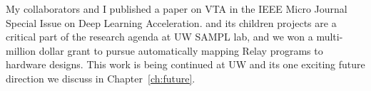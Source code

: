 My collaborators and I published a paper on VTA in
  the IEEE Micro Journal Special Issue on Deep Learning Acceleration.
\vta and its children projects are a critical part of the research
  agenda at UW SAMPL lab, and we won a multi-million dollar grant to
  pursue automatically mapping Relay programs to hardware designs.
This work is being continued at UW and its one exciting future
  direction we discuss in Chapter~\ref{ch:future}.
